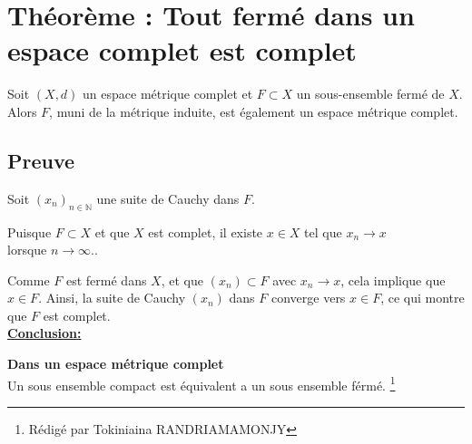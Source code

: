 \documentclass[12pt]{book}
\begin{document}
\section {Théorème : Tout fermé dans un espace complet est complet} Soit \( (X, d) \) un espace métrique complet et \( F \subset X \) un sous-ensemble fermé de \( X \). Alors \( F \), muni de la métrique induite, est également un espace métrique complet. \subsection*{Preuve} Soit \( (x_n)_{n \in \mathbb{N}} \) une suite de Cauchy dans \( F \). \par
Puisque \( F \subset X \) et que \( X \) est complet, il existe \( x \in X \) tel que \( x_n \to x \) \\ lorsque \( n \to \infty. \).\par Comme \( F \) est fermé dans \( X \), et que \( (x_n) \subset F \) avec \( x_n \to x \), cela implique que \( x \in F \). Ainsi, la suite de Cauchy \( (x_n) \) dans \( F \) converge vers \( x \in F \), ce qui montre que \( F \) est complet.\\
\vspace{0.5cm}
\underline{\textbf{Conclusion:}}

\textbf{Dans un espace métrique complet} \\ Un sous ensemble compact est équivalent a un sous ensemble férmé.
\clearpage
\footnote{R\'edig\'e par Tokiniaina RANDRIAMAMONJY}
\end{document}
